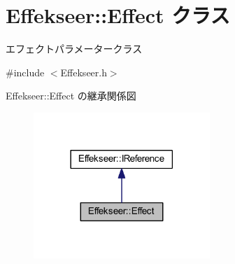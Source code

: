 \hypertarget{class_effekseer_1_1_effect}{}\section{Effekseer\+:\+:Effect クラス}
\label{class_effekseer_1_1_effect}


エフェクトパラメータークラス  




{\ttfamily \#include $<$Effekseer.\+h$>$}



Effekseer\+:\+:Effect の継承関係図\nopagebreak
\begin{figure}[H]
\begin{center}
\leavevmode
\includegraphics[width=189pt]{class_effekseer_1_1_effect__inherit__graph}
\end{center}
\end{figure}
